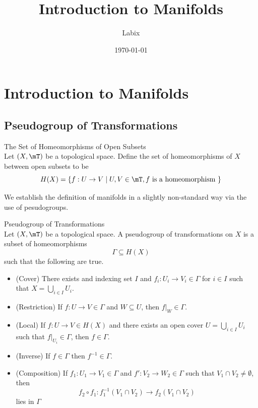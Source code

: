 \documentclass[a4paper]{article}
\title{Introduction to Manifolds}
\author{Labix}
\date{\today}
\begin{document}
\maketitle
\begin{abstract}
\end{abstract}
\pagebreak
\tableofcontents
\pagebreak

\section{Introduction to Manifolds}
\subsection{Pseudogroup of Transformations}
\begin{defn}{The Set of Homeomorphisms of Open Subsets}{}\\
Let $(X,\mT)$ be a topological space. Define the set of homeomorphisms of $X$ between open subsets to be $$H(X)=\{f:U\to V\;|\;U,V\in\mT, f\text{ is a homeomorphism }\}$$
\end{defn}

We establish the definition of manifolds in a slightly non-standard way via the use of pesudogroups. 

\begin{defn}{Pseudogroup of Transformations}{}\\
Let $(X,\mT)$ be a topological space. A pseudogroup of transformations on $X$ is a subset of homeomorphisms $$\Gamma\subseteq H(X)$$ such that the following are true. 
\begin{itemize}
\item (Cover) There exists and indexing set $I$ and $f_i:U_i\to V_i\in\Gamma$ for $i\in I$ such that $X=\bigcup_{i\in I}U_i$. 
\item (Restriction) If $f:U\to V\in\Gamma$ and $W\subseteq U$, then $f|_W\in\Gamma$. 
\item (Local) If $f:U\to V\in H(X)$ and there exists an open cover $U=\bigcup_{i\in I}U_i$ such that $f|_{U_i}\in\Gamma$, then $f\in\Gamma$. 
\item (Inverse) If $f\in\Gamma$ then $f^{-1}\in\Gamma$. 
\item (Composition) If $f_1:U_1\to V_1\in\Gamma$ and $f':V_2\to W_2\in\Gamma$ such that $V_1\cap V_2\neq\emptyset$, then $$f_2\circ f_1:f_1^{-1}(V_1\cap V_2)\to f_2(V_1\cap V_2)$$ lies in $\Gamma$
\end{itemize}
\end{defn}
\end{document}
